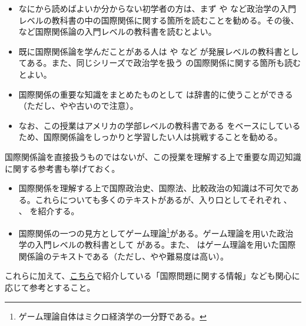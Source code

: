 \documentclass[
  xelatex,
  ja=standard]{bxjsarticle}
\providecommand{\tightlist}{%
  \setlength{\itemsep}{0pt}\setlength{\parskip}{0pt}}\usepackage{longtable,booktabs,array}
\begin{document}
\begin{itemize}
\tightlist
\item
  なにから読めばよいか分からない初学者の方は、まず \citet{sunahara2020}
  や \citet{sakamoto2020}
  など政治学の入門レベルの教科書の中の国際関係に関する箇所を読むことを勧める。その後、
  \citet{murata2023} など国際関係論の入門レベルの教科書を読むとよい。
\item
  既に国際関係論を学んだことがある人は \citet{nakanishi2013} や
  \citet{yamakage2012} など
  が発展レベルの教科書としてある。また、同じシリーズで政治学を扱う
  \citet{kume2011} の国際関係に関する箇所も読むとよい。
\item
  国際関係の重要な知識をまとめたものとして \citet{tanaka2010}
  は辞書的に使うことができる（ただし、やや古いので注意）。
\item
  なお、この授業はアメリカの学部レベルの教科書である \citet{frieden2019}
  をベースにしているため、国際関係論をしっかりと学習したい人は挑戦することを勧める。
\end{itemize}

国際関係論を直接扱うものではないが、この授業を理解する上で重要な周辺知識に関する参考書も挙げておく。

\begin{itemize}
\tightlist
\item
  国際関係を理解する上で国際政治史、国際法、比較政治の知識は不可欠である。これらについても多くのテキストがあるが、入り口としてそれぞれ
  \citet{ogawa2018} 、\citet{tamada2022} 、 \citet{kubo2016}
  を紹介する。
\item
  国際関係の一つの見方としてゲーム理論\footnote{ゲーム理論自体はミクロ経済学の一分野である。}がある。ゲーム理論を用いた政治学の入門レベルの教科書として
  \citet{asako2018} がある。また、 \citet{okada2020}
  はゲーム理論を用いた国際関係論のテキストである（ただし、やや難易度は高い）。
\end{itemize}

これらに加えて、\href{https://sdoi.notion.site/bc51220cd2c54100a75981e56123b235}{こちら}で紹介している「国際問題に関する情報」なども関心に応じて参考とすること。


  
\end{document}
